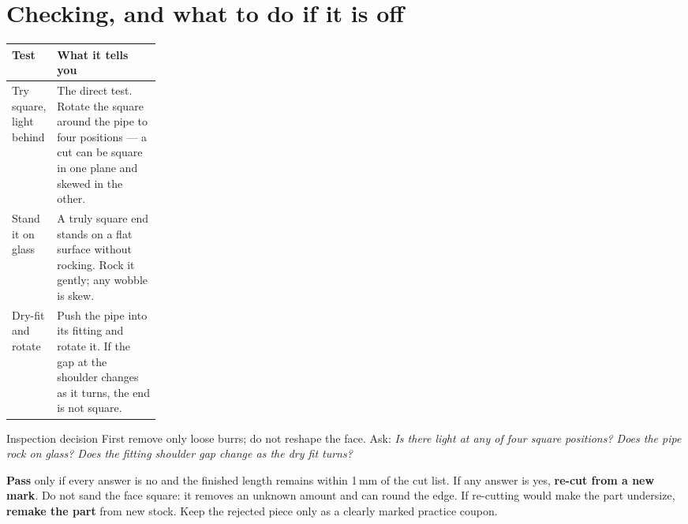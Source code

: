 \section{Checking, and what to do if it is off}
\begin{center}
\end{center}

\begin{tabularx}{\linewidth}{@{}p{0.22\linewidth}L@{}}
\toprule
\textbf{Test} & \textbf{What it tells you}\\
\midrule
Try square, light behind & The direct test. Rotate the square around the pipe to four positions --- a cut can be square in one plane and skewed in the other.\\
Stand it on glass & A truly square end stands on a flat surface without rocking. Rock it gently; any wobble is skew.\\
Dry-fit and rotate & Push the pipe into its fitting and rotate it. If the gap at the shoulder changes as it turns, the end is not square.\\
\bottomrule
\end{tabularx}

\begin{telospanel}{Inspection decision}
First remove only loose burrs; do not reshape the face. Ask: \emph{Is there
light at any of four square positions? Does the pipe rock on glass? Does the
fitting shoulder gap change as the dry fit turns?}

\textbf{Pass} only if every answer is no and the finished length remains within
1\,mm of the cut list. If any answer is yes, \textbf{re-cut from a new mark}.
Do not sand the face square: it removes an unknown amount and can round the
edge. If re-cutting would make the part undersize, \textbf{remake the part} from
new stock. Keep the rejected piece only as a clearly marked practice coupon.
\end{telospanel}


